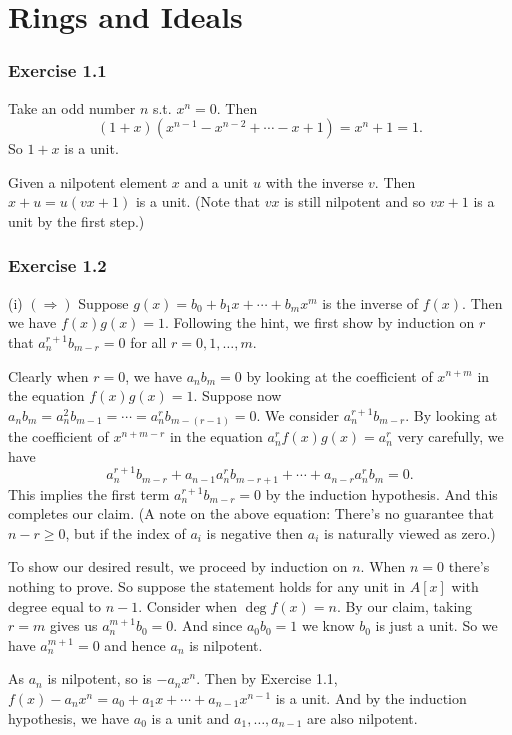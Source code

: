 \documentclass[../A&M.tex]{subfiles}
\begin{document}
\chapter{Rings and Ideals}

\subsection*{Exercise 1.1}

Take an odd number $n$ s.t. $x^n=0$. Then
$$
(1+x)(x^{n-1}-x^{n-2}+\cdots-x+1)=x^n+1=1.
$$
So $1+x$ is a unit.

Given a nilpotent element $x$ and a unit $u$ with the inverse $v$. Then $x+u=u(vx+1)$ is a unit. (Note that $vx$ is still nilpotent and so $vx+1$ is a unit by the first step.)

\subsection*{Exercise 1.2}

(i) $(\Rightarrow)$ Suppose $g(x)=b_0+b_1x+\cdots+b_mx^m$ is the inverse of $f(x)$. Then we have $f(x)g(x)=1$. Following the hint, we first show by induction on $r$ that $a_n^{r+1} b_{m-r}=0$ for all $r=0,1,\ldots,m$.

Clearly when $r=0$, we have $a_n b_m=0$ by looking at the coefficient of $x^{n+m}$ in the equation $f(x)g(x)=1$. Suppose now $a_n b_m = a_n^2 b_{m-1} = \cdots = a_n^r b_{m-(r-1)} = 0$. We consider $a_n^{r+1} b_{m-r}$. By looking at the coefficient of $x^{n+m-r}$ in the equation $a_n^r f(x)g(x) = a_n^r$ very carefully, we have
$$
a_n^{r+1} b_{m-r} + a_{n-1} a_n^r b_{m-r+1} + \cdots + a_{n-r} a_n^r b_m = 0.
$$
This implies the first term $a_n^{r+1} b_{m-r}=0$ by the induction hypothesis. And this completes our claim. (A note on the above equation: There's no guarantee that $n-r\geq0$, but if the index of $a_i$ is negative then $a_i$ is naturally viewed as zero.)

To show our desired result, we proceed by induction on $n$. When $n=0$ there's nothing to prove. So suppose the statement holds for any unit in $A[x]$ with degree equal to $n-1$. Consider when $\deg f(x)=n$. By our claim, taking $r=m$ gives us $a_n^{m+1} b_0=0$. And since $a_0b_0=1$ we know $b_0$ is just a unit. So we have $a_n^{m+1}=0$ and hence $a_n$ is nilpotent.

As $a_n$ is nilpotent, so is $-a_nx^n$. Then by Exercise 1.1, $f(x)-a_nx^n = a_0+a_1x+\cdots+a_{n-1}x^{n-1}$ is a unit. And by the induction hypothesis, we have $a_0$ is a unit and $a_1,\ldots,a_{n-1}$ are also nilpotent.
\end{document}
